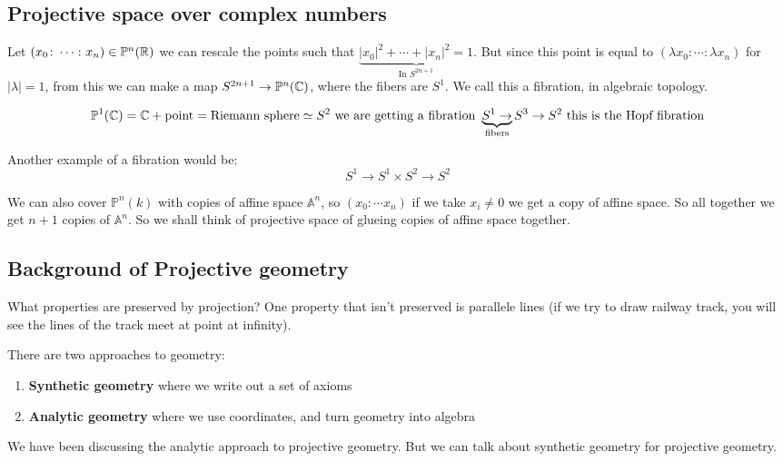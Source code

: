\subsection{Projective space over complex numbers}
Let $(x_0\colon\cdots\colon x_n)\in \mathbb{P}^n(\mathbb{R})$ we can rescale the points such that $\underbrace{|x_0|^2+\cdots+|x_n|^2 = 1}_{\text{In }S^{2n+1}}$. But since this point is equal to $(\lambda x_0\colon \cdots\colon\lambda x_n)$ for $|\lambda| = 1$, from this we can make a map $S^{2n+1}\rightarrow \mathbb{P}^n(\mathbb{C})$, where the fibers are $S^1$. We call this a fibration, in algebraic topology.

\begin{align*}
    \mathbb{P}^1(\mathbb{C}) = \mathbb{C} + \text{point} = \text{Riemann sphere}\simeq S^2 \text{ we are getting a fibration }\underbrace{S^1\rightarrow}_{\text{fibers}}S^3\rightarrow S^2 \text{ this is the Hopf fibration}
\end{align*}

Another example of a fibration would be:\begin{equation*}
    S^1\rightarrow S^1\times S^2\rightarrow S^2
\end{equation*}

We can also cover $\mathbb{P}^n(k)$ with copies of affine space $\mathbb{A}^n$, so $(x_0\colon \cdots x_n)$ if we take $x_i\neq 0$ we get a copy of affine space. So all together we get $n+1$ copies of $\mathbb{A}^n$. So we shall think of projective space of glueing copies of affine space together.

\subsection{Background of Projective geometry}

What properties are preserved by projection? One property that isn't preserved is parallele lines (if we try to draw railway track, you will see the lines of the track meet at point at infinity).


There are two approaches to geometry:\begin{definition}
    \begin{enumerate}
        \item \textbf{Synthetic geometry} where we write out a set of axioms
        \item \textbf{Analytic geometry} where we use coordinates, and turn geometry into algebra
    \end{enumerate}
\end{definition}
We have been discussing the analytic approach to projective geometry. But we can talk about synthetic geometry for projective geometry.

